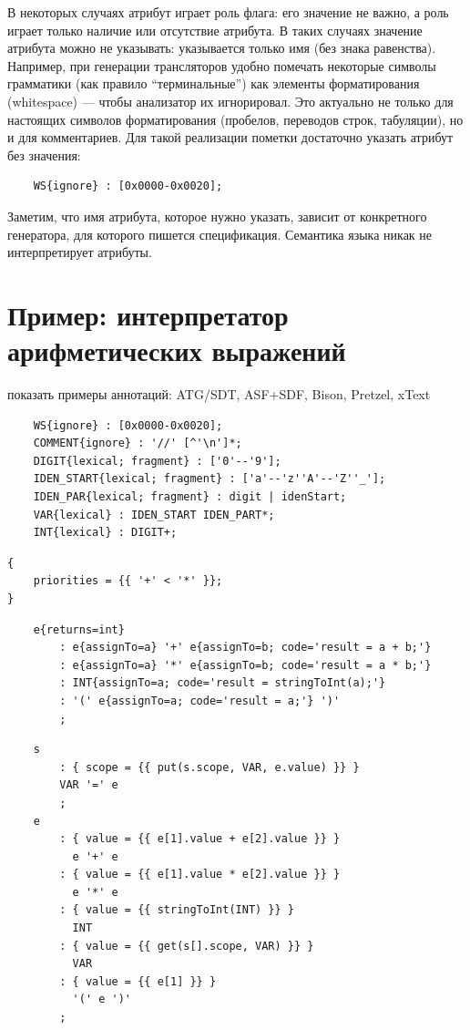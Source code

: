 В некоторых случаях атрибут играет роль флага: его значение не важно, а роль играет только наличие или отсутствие атрибута. В таких случаях значение атрибута можно не указывать: указывается только имя (без знака равенства). Например, при генерации трансляторов удобно помечать некоторые символы грамматики (как правило ``терминальные'') как элементы форматирования (whitespace) --- чтобы анализатор их игнорировал. Это актуально не только для настоящих символов форматирования (пробелов, переводов строк, табуляции), но и для комментариев. Для такой реализации пометки достаточно указать атрибут без значения:
\begin{lstlisting}
	WS{ignore} : [0x0000-0x0020];
\end{lstlisting}
Заметим, что имя атрибута, которое нужно указать, зависит от конкретного генератора, для которого пишется спецификация. Семантика языка  никак не интерпретирует атрибуты.

\section{Пример: интерпретатор арифметических выражений}

показать примеры аннотаций: ATG/SDT, ASF+SDF, Bison, Pretzel, xText

\begin{lstlisting}
	WS{ignore} : [0x0000-0x0020];
	COMMENT{ignore} : '//' [^'\n']*;
	DIGIT{lexical; fragment} : ['0'--'9'];
	IDEN_START{lexical; fragment} : ['a'--'z''A'--'Z''_'];
	IDEN_PAR{lexical; fragment} : digit | idenStart;
	VAR{lexical} : IDEN_START IDEN_PART*;
	INT{lexical} : DIGIT+;
\end{lstlisting}

\begin{lstlisting}
{
	priorities = {{ '+' < '*' }};
}
\end{lstlisting}

\begin{lstlisting}
	e{returns=int} 
		: e{assignTo=a} '+' e{assignTo=b; code='result = a + b;'}
		: e{assignTo=a} '*' e{assignTo=b; code='result = a * b;'}
		: INT{assignTo=a; code='result = stringToInt(a);'}
		: '(' e{assignTo=a; code='result = a;'} ')'
		;
\end{lstlisting}

\begin{lstlisting}
	s
		: { scope = {{ put(s.scope, VAR, e.value) }} }
		VAR '=' e
		;
	e
		: { value = {{ e[1].value + e[2].value }} }
		  e '+' e
		: { value = {{ e[1].value * e[2].value }} }
		  e '*' e
		: { value = {{ stringToInt(INT) }} }
		  INT
		: { value = {{ get(s[].scope, VAR) }} }
		  VAR
		: { value = {{ e[1] }} }
		  '(' e ')'
		;
\end{lstlisting}

